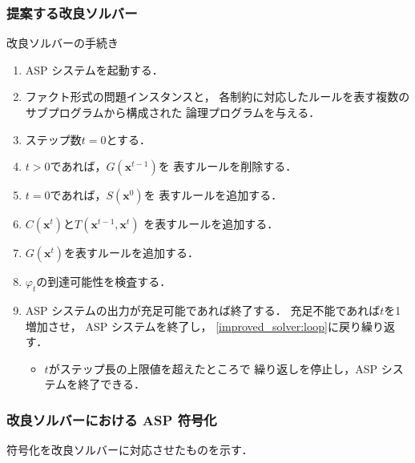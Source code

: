 \documentclass[dvipdfmx,11pt]{beamer}
\begin{document}
\begin{frame}\frametitle{提案する改良ソルバー}

  \begin{block}{改良ソルバーの手続き}
    \begin{enumerate}
      \item ASP システムを起動する．
      \item ファクト形式の問題インスタンスと，
            各制約に対応したルールを表す複数のサブプログラムから構成された
            論理プログラムを与える．
      \item ステップ数$t=0$とする．
      \item $t>0$であれば，$G(\bm{x}^{t -1})$を
            表すルールを削除する． \label{improved_solver:loop}
      \item $t=0$であれば，$S(\bm{x}^0)$を
            表すルールを追加する．
      \item $C(\bm{x}^{t})$と$T(\bm{x}^{t-1},\bm{x}^{t})$
            を表すルールを追加する．
      \item $G(\bm{x}^{t})$を表すルールを追加する．
      \item $\varphi_{t}$の到達可能性を検査する．
      \item ASP システムの出力が充足可能であれば終了する．
            充足不能であれば$t$を1増加させ，
            ASP システムを終了し，
            \ref{improved_solver:loop}に戻り繰り返す．
            \begin{itemize}
              \item $t$がステップ長の上限値を超えたところで
                    繰り返しを停止し，ASP システムを終了できる．
            \end{itemize} \label{improved_solver:end}
    \end{enumerate}
  \end{block}

\end{frame}

\begin{frame}\frametitle{改良ソルバーにおける ASP 符号化}

  符号化を改良ソルバーに対応させたものを示す．
  \begin{exampleblock}{}
    
  \end{exampleblock}
  
\end{frame}
\end{document}

